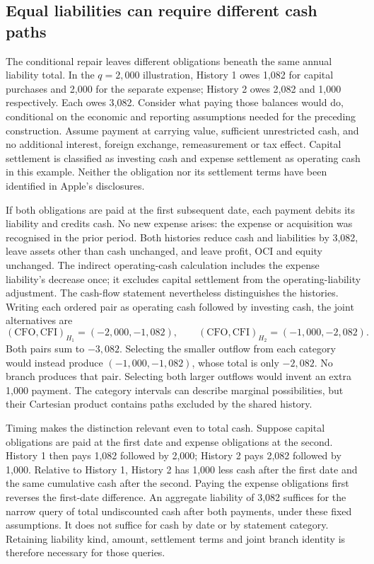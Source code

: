 \subsection{Equal liabilities can require different cash paths}
\label{sec:apple-settlement-paths}

The conditional repair leaves different obligations beneath the same annual
liability total. In the $q=2{,}000$ illustration, History 1 owes 1,082 for
capital purchases and 2,000 for the separate expense; History 2 owes 2,082
and 1,000 respectively. Each owes 3,082. Consider what paying those balances
would do, conditional on the economic and reporting assumptions needed for
the preceding construction. Assume payment at carrying value, sufficient
unrestricted cash, and no additional interest, foreign exchange,
remeasurement or tax effect. Capital settlement is classified as investing
cash and expense settlement as operating cash in this example. Neither
the obligation nor its settlement terms have been identified in Apple's
disclosures.

If both obligations are paid at the first subsequent date, each payment
debits its liability and credits cash. No new expense arises: the expense
or acquisition was recognised in the prior period. Both histories reduce
cash and liabilities by 3,082, leave assets other than cash unchanged, and
leave profit, OCI and equity unchanged. The indirect operating-cash
calculation includes the expense liability's decrease once; it excludes
capital settlement from the operating-liability adjustment. The
cash-flow statement nevertheless distinguishes the histories. Writing
each ordered pair as operating cash followed by investing cash, the
joint alternatives are
\[
(\mathrm{CFO},\mathrm{CFI})_{H_1}=(-2{,}000,-1{,}082),
\qquad
(\mathrm{CFO},\mathrm{CFI})_{H_2}=(-1{,}000,-2{,}082).
\]
Both pairs sum to $-3{,}082$. Selecting the smaller outflow from each
category would instead produce $(-1{,}000,-1{,}082)$, whose total is only
$-2{,}082$. No branch produces that pair. Selecting both larger outflows
would invent an extra 1,000 payment. The category intervals can describe
marginal possibilities, but their Cartesian product contains paths
excluded by the shared history.

Timing makes the distinction relevant even to total cash. Suppose capital
obligations are paid at the first date and expense obligations at the
second. History 1 then pays 1,082 followed by 2,000; History 2 pays 2,082
followed by 1,000. Relative to History 1, History 2 has 1,000 less cash
after the first date and the same cumulative cash after the second.
Paying the expense obligations first reverses the first-date difference.
An aggregate liability of 3,082 suffices for the narrow query of total
undiscounted cash after both payments, under these fixed assumptions.
It does not suffice for cash by date or by statement category. Retaining
liability kind, amount, settlement terms and joint branch identity is
therefore necessary for those queries.

